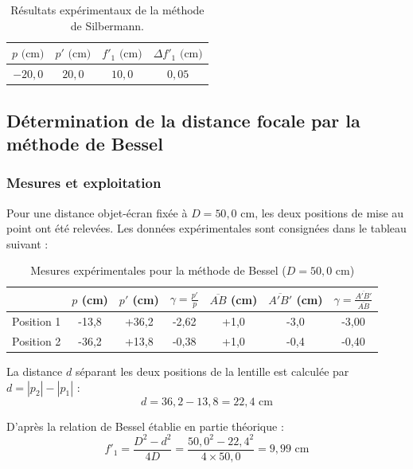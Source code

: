 \begin{table}[h]
    \centering
    \begin{tabular}{|c|c|c|c|}
        \hline
        $p \text{ (cm)}$ & $p' \text{ (cm)}$ & $f'_1 \text{ (cm)}$ & $\Delta f'_1 \text{ (cm)}$ \\
        \hline
        $-20{,}0$ & $20{,}0$ & $10{,}0$ & $0{,}05$ \\
        \hline
    \end{tabular}
    \caption{Résultats expérimentaux de la méthode de Silbermann.}
\end{table}


\subsection{Détermination de la distance focale par la méthode de Bessel}

\subsubsection{Mesures et exploitation}

Pour une distance objet-écran fixée à $D = 50,0 \text{ cm}$, les deux positions de mise au point ont été relevées.
Les données expérimentales sont consignées dans le tableau suivant :

\begin{table}[h!]
\centering
\begin{tabular}{|l|c|c|c|c|c|c|}
\hline
 & $p$ (cm) & $p'$ (cm) & $\gamma = \frac{p'}{p}$ & $\overline{AB}$ (cm) & $\overline{A'B'}$ (cm) & $\gamma = \frac{\overline{A'B'}}{\overline{AB}}$ \\ \hline
Position 1 & -13,8 & +36,2 & -2,62 & +1,0 & -3,0 & -3,00 \\ \hline
Position 2 & -36,2 & +13,8 & -0,38 & +1,0 & -0,4 & -0,40 \\ \hline
\end{tabular}
\caption{Mesures expérimentales pour la méthode de Bessel ($D = 50,0 \text{ cm}$)}
\end{table}

La distance $d$ séparant les deux positions de la lentille est calculée par $d = |p_2| - |p_1|$ :
\begin{equation}
    d = 36,2 - 13,8 = 22,4 \text{ cm}
\end{equation}

D'après la relation de Bessel établie en partie théorique :
\begin{equation}
    f'_1 = \frac{D^2 - d^2}{4D} = \frac{50,0^2 - 22,4^2}{4 \times 50,0} = 9,99 \text{ cm}
\end{equation}

